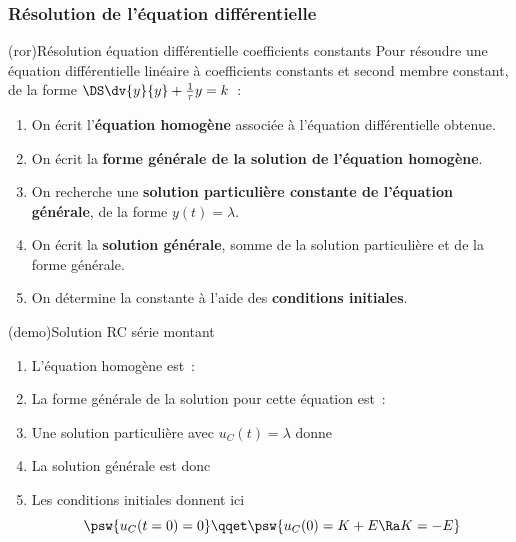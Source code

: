 \documentclass[../../main/main.tex]{subfiles}
\begin{document}
\subsubsection{Résolution de l'équation différentielle}
\begin{tcb}[label=impo:eqres, heart](ror){Résolution équation différentielle
			coefficients constants}
	Pour résoudre une équation différentielle linéaire à
	coefficients constants et second membre constant, de la forme
	$\DS \dv{y}{y} + \frac{1}{\tau}y = k$~:
	\begin{enumerate}[label=\sqenumi]
		\item On écrit l'\textbf{équation homogène} associée à
		      l'équation différentielle obtenue.
		\item On écrit la \textbf{forme générale de la solution de
			      l'équation homogène}.
		\item On recherche une \textbf{solution particulière
			      constante de l'équation générale}, de la forme $y(t) =
			      \lambda$.
		\item On écrit la \textbf{solution générale}, somme de la
		      solution particulière et de la forme générale.
		\item On détermine la constante à l'aide des
		      \textbf{conditions initiales}.
	\end{enumerate}
\end{tcb}
\begin{tcb}[label=demo:rcsolu](demo){Solution RC série montant}
	\begin{enumerate}[label=\sqenumi]
		\item L'équation homogène est~:
		      \psw{
			      \[
				      \dv{u_C}{t} + \frac{1}{\tau}u_C = 0
			      \]
		      }
		      \vspace{-15pt}
		\item La forme générale de la solution pour cette équation est~:
		      \psw{
			      \[
				      u_C(t) = K\exp\left( -\frac{t}{\tau} \right)
			      \]
		      }
		      \vspace{-15pt}
		\item Une solution particulière avec $u_C(t) = \lambda$ donne
		\item La solution générale est donc
		      \psw{
			      \[
				      u_C(t) = E + K\exp \left( - \frac{t}{\tau} \right)
			      \]
		      }
		      \vspace{-15pt}
		\item Les conditions initiales donnent ici
		      \[
			      \psw{u_C(t=0) = 0}
			      \qqet
			      \psw{u_C(0) = K + E \Ra K=-E}
		      \]
	\end{enumerate}
\end{tcb}
\end{document}
